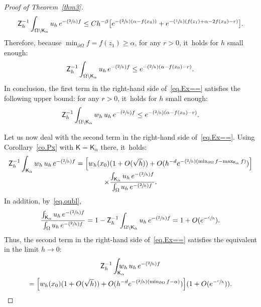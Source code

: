 \documentclass[10pt]{amsart}
\newcommand{\Psfrac}[2]{(\sfrac{#1}{#2})}
\theoremstyle{plain}
\theoremstyle{definition}
\begin{document}
\begin{proof}[Proof of Theorem~\ref{thm3}]
\[
{\mathsf Z_h^{-1}}\int_{\Omega \setminus \mathsf K_{\alpha}}
{u}_h\, e^{-\Psfrac{2}{h}f}\le Ch^{-\beta} \big [ e^{-\Psfrac 2h (\alpha -f(x_0))}+ e^{-\Psfrac 1h (f(z_1)+\alpha -2f(x_0)-r)} \big].
\]
Therefore, because $\min_{\partial \Omega }f=f(z_1)\ge \alpha$, for any $r>0$, it~holds for $h$ small enough:\vspace*{-3pt}
\begin{equation}\label{eq.oubl}
{\mathsf Z_h^{-1}}\int_{\Omega \setminus \mathsf K_{\alpha}}
{u}_h\, e^{-\Psfrac{2}{h}f}\le e^{-\Psfrac 2h (\alpha -f(x_0)-r)}.
\end{equation}
In conclusion, the first term in the right-hand side of~\eqref{eq.Ex==} satisfies the following upper bound: for any $r>0$, it~holds for $h$ small enough:\vspace*{-3pt}
\begin{equation}\label{eq.Est1-EE2}
{\mathsf Z_h^{-1}} \int_{\Omega \setminus \mathsf K_{\alpha}}w_h\,
{u}_h\, e^{-\Psfrac{2}{h}f} \le e^{-\Psfrac 2h (\alpha -f(x_0)-r)}.
\end{equation}

Let us now deal with the second term in the right-hand side of~\eqref{eq.Ex==}. Using Corollary~\ref{co.Px} with $\mathsf K=\mathsf K_{\alpha}$ there, it~holds:\vspace*{-5pt}
\begin{multline*}
{\mathsf Z_h^{-1}} \int_{\mathsf K_{\alpha}} w_h\, {u}_h\,
e^{-\Psfrac{2}{h}f} = \Big[w_h(x_0)(1+O(\sqrt h))+ O(h^{-d}e^{-\Psfrac
2h (\min_{\partial \Omega }f-\max_{\mathsf K_{\alpha}} f)}) \Big]
\\[-5pt]
\times \frac{\int_{\mathsf K_{\alpha}} {u}_h\, e^{-\Psfrac{2}{h}f}
}{ \int_{\Omega} {u}_h\, e^{-\Psfrac{2}{h}f} }.
\end{multline*}
In addition, by~\eqref{eq.oubl},
\[
\frac{\int_{\mathsf K_{\alpha}} {u}_h\, e^{-\Psfrac{2}{h}f} }{ \int_{\Omega} {u}_h\, e^{-\Psfrac{2}{h}f} }=1- {\mathsf Z_h^{-1}}\int_{\Omega \setminus \mathsf K_{\alpha}}
{u}_h\, e^{-\Psfrac{2}{h}f}=1+O(e^{-\sfrac ch}).
\]
Thus, the second term in the right-hand side of~\eqref{eq.Ex==} satisfies the equivalent in the limit $h\to 0$:
\begin{multline}\label{eq.Est1-EE3}
{\mathsf Z_h^{-1}} \int_{\mathsf K_{\alpha}} \!\!\! \!\!\! w_h\, {u}_h\, e^{-\Psfrac{2}{h}f}\\
= \Big[w_h(x_0)(1+O(\sqrt h))+ O(h^{-d}e^{-\Psfrac 2h (\min_{\partial \Omega }f-\alpha)}) \Big] (1+O(e^{-\sfrac ch})).
\end{multline}


\end{proof}
\end{document}
